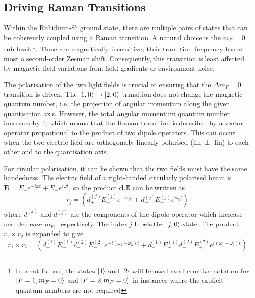 \subsection{Driving Raman Transitions}\label{subsec:theory_rb87_raman}
Within the Rubidium-87 ground state, there are multiple pairs of
states that can be coherently coupled using a Raman transition.
A natural choice is the $m_F = 0$ sub-levels\footnote{In what follows,
  the states $\ket{1}$ and $\ket{2}$ will be used as alternative
  notation for $\ket{F=1,m_F=0}$ and $\ket{F=2,m_F=0}$ in instances
  where the
explicit quantum numbers are not required}. These
are magnetically-insensitive; their transition frequency has at most a
second-order Zeeman shift. Consequently, this transition is least
affected by magnetic field variations from field gradients or
environment noise. 
\par\noindent
The polarisation of the two light fields is
crucial to ensuring that the $\Delta m_F = 0$ transition is driven.
The $\ket{1,0} \rightarrow \ket{2,0}$ transition does not change the
magnetic quantum number, i.e. the projection of angular momentum
along the given quantisation axis. However, the total angular momentum quantum number
increases by 1, which means that the Raman transition is described by a vector
operator proportional to the product of two dipole operators. This can
occur when the two electric
field are orthogonally linearly polarised (lin $\perp$ lin) to each
other and to the quantisation axis. \par\noindent
For circular polarisation, it can be shown that the two fields must
have the same handedness. The electric field of a right-handed
circularly polarised beam is $\textbf{E} = E_+ e^{-i \omega t} + E_-
e^{i \omega t}$, so the product $\textbf{d.E}$
can be written as
\begin{equation}
  \label{eq:dipole_expansion}
  r_j =  
(d^{(j)}_+ E^{(j)}_+ e^{-i \omega_j t} + d^{(j)}_- E^{(j)}_- e^{i
\omega_j t})
\end{equation}
where $d^{(j)}_+$ and $d^{(j)}_-$ are the components of the dipole operator which
increase and decrease $m_F$, respectively. The index $j$ labels
the $\ket{j,0}$ state. The product $r_1 \times r_2$ is expanded to
give
\begin{equation}
  \label{eq:dipole_exp}
r_1 \times r_2= (d^{(1)}_+ E^{(1)}_+ d^{(2)}_- E^{(2)}_- e^{-i (\omega_1 - \omega_2)
  t} + d^{(1)}_- E^{(1)}_- d^{(2)}_+ E^{(2)}_+  e^{i(
\omega_1 -\omega_2)t})
\end{equation}
